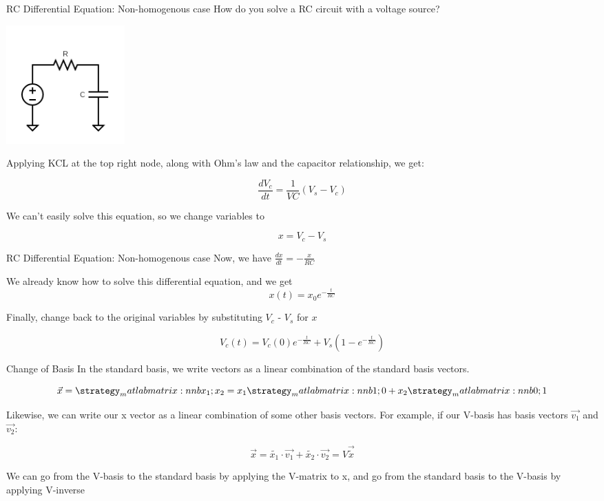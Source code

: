\documentclass{beamer}
\begin{document}
	\begin{frame}{RC Differential Equation: Non-homogenous case}
	    How do you solve a RC circuit with a voltage source?
    	
    	\begin{center}
    	    \includegraphics[width=0.2\textwidth]{rc-circuits-3.png}
    	\end{center}
    	
    	Applying KCL at the top right node, along with Ohm’s law and the capacitor relationship, we get:

        $$\frac{dV_c}{dt} = \frac{1}{VC}(V_s - V_c)$$
        
        We can't easily solve this equation, so we change variables to
        
        $$x = V_c - V_s$$
	\end{frame}
	
	\begin{frame}{RC Differential Equation: Non-homogenous case}
	    Now, we have $\frac{dx}{dt} = -\frac{x}{RC}$
    	
    	We already know how to solve this differential equation, and we get                              
        $$x(t) = x_0e^{-\frac{t}{RC}}$$
        
        Finally, change back to the original variables by substituting $V_c$ - $V_s$ for $x$
    	
    	$$V_c(t) = V_c(0)e^{-\frac{t}{RC}} + V_s(1 - e^{-\frac{t}{RC}})$$
	\end{frame}
	
	\begin{frame}{Change of Basis}
	    In the standard basis, we write vectors as a linear combination of the standard basis vectors.

        $$\vec{x} = \mat{x_1;x_2} = x_1\mat{1;0} + x_2\mat{0;1}$$
        
        Likewise, we can write our x vector as a linear combination of some other basis vectors. For example, if our V-basis has basis vectors $\vec{v_1}$ and $\vec{v_2}$:
        
        $$\vec{x} = \tilde{x_1}\cdot\vec{v_1} + \tilde{x_2}\cdot\vec{v_2} = V\vec{\tilde{x}}$$
        
        We can go from the V-basis to the standard basis by applying the V-matrix to x, and go from the standard basis to the V-basis by applying V-inverse
	\end{frame}
	
\end{document}
